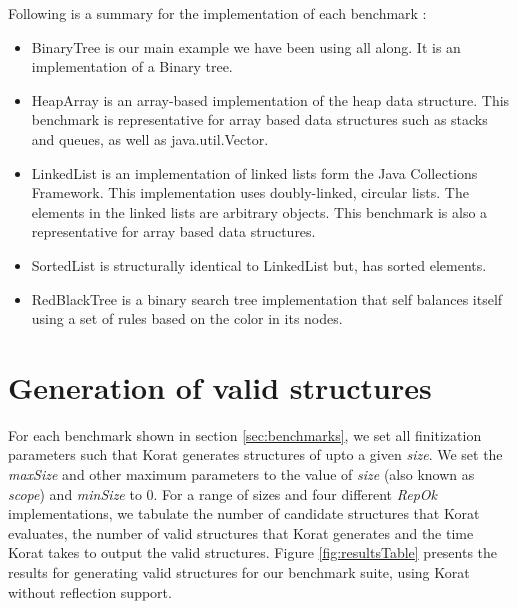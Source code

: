 \para
Following is a summary for the implementation of each benchmark : 
\begin{itemize}
\item BinaryTree is our main example we have been using all along. It is an implementation of a Binary tree.
\item HeapArray is an array-based implementation of the heap data structure. This benchmark is representative for array based data structures such as stacks and queues, as well as java.util.Vector.
\item LinkedList is an implementation of linked lists form the Java Collections Framework. This implementation uses doubly-linked, circular lists. The elements in the linked lists are arbitrary objects. This benchmark is also a representative for array based data structures.
\item SortedList is structurally identical to LinkedList but, has sorted elements.
\item RedBlackTree is a binary search tree implementation that self balances itself using a set of rules based on the color in its nodes.
\end{itemize}


\section{Generation of valid structures}
\label{sec:generation-of-valid-structures}
For each benchmark shown in section \ref{sec:benchmarks}, we set all
finitization parameters such that Korat generates structures of upto a
given \emph{size}. We set the \emph{maxSize} and other maximum
parameters to the value of \emph{size} (also known as \emph{scope})
and \emph{minSize} to 0. For a range of sizes and four different
\emph{RepOk} implementations, we tabulate the number of candidate
structures that Korat evaluates, the number of valid structures that
Korat generates and the time Korat takes to output the valid
structures. Figure \ref{fig:resultsTable} presents the results for
generating valid structures for our benchmark suite, using Korat
without reflection support.

